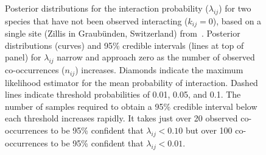 \documentclass[12pt]{article}
\begin{document}
  \begin{figure}[h!]
    \caption{Posterior distributions for the interaction probability ($\lambda_{ij}$) for two species that have not been observed interacting ($k_{ij}=0$), based on a single site (Zillis in Graub\"{u}nden, Switzerland) from~\citet{Kopelke2017}. Posterior distributions (curves) and 95\% credible intervals (lines at top of panel) for $\lambda_{ij}$ narrow and approach zero as the number of observed co-occurrences ($n_{ij}$) increases. Diamonds indicate the maximum likelihood estimator for the mean probability of interaction.
    Dashed lines indicate threshold probabilities of 0.01, 0.05, and 0.1. The number of samples required to obtain a 95\% credible interval below each threshold increases rapidly. It takes just over 20 observed co-occurrences to be 95\% confident that $\lambda_{ij}<0.10$ but over 100 co-occurrences to be 95\% confident that $\lambda_{ij}<0.01$.}
    \label{Salix_pdfs_cdfs}
    \begin{center}
    \end{center}
    \end{figure}




\clearpage

     
\end{document}
